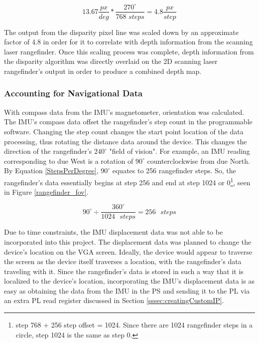 \begin{equation} \label{yeeboi}
13.67\frac{px}{deg}*\frac{270^\circ}{768\,\,steps} = 4.8\frac{px}{step}
\end{equation}
\par
The output from the disparity pixel line was scaled down by an approximate factor of 4.8 in order for it to correlate with depth information from the scanning laser rangefinder. Once this scaling process was complete, depth information from the disparity algorithm was directly overlaid on the 2D scanning laser rangefinder's output in order to produce a combined depth map. 

\subsubsection{Accounting for Navigational Data}
With compass data from the IMU's magnetometer, orientation was calculated. The IMU's compass data offset the rangefinder's step count in the programmable software. Changing the step count changes the start point location of the data processing, thus rotating the distance data around the device. This changes the direction of the rangefinder's $240^\circ$ "field of vision". For example, an IMU reading corresponding to due West is a rotation of $90^\circ$ counterclockwise from due North. By Equation \ref{StepsPerDegree}, $90^\circ$ equates to 256 rangefinder steps. So, the rangefinder's data essentially begins at step 256 and end at step 1024 or 0\footnote{step 768 + 256 step offset = 1024. Since there are 1024 rangefinder steps in a circle, step 1024 is the same as step 0.}, seen in Figure \ref{rangefinder_fov}.

\begin{equation}
	90^\circ \div \dfrac{360^\circ}{1024 \textrm{ } steps}  = 256 \textrm{ } steps
	\label{StepsPerDegree}
\end{equation}

\par
Due to time constraints, the IMU displacement data was not able to be incorporated into this project. The displacement data was planned to change the device's location on the VGA screen. Ideally, the device would appear to traverse the screen as the device itself traverses a location, with the rangefinder's data traveling with it. Since the rangefinder's data is stored in such a way that it is localized to the device's location, incorporating the IMU's displacement data is as easy as obtaining the data from the IMU in the PS and sending it to the PL via an extra PL read register discussed in Section \ref{sssec:creatingCustomIP}.


